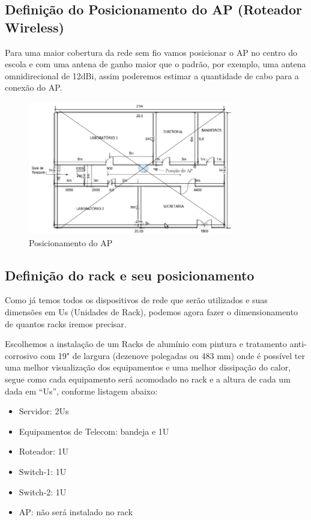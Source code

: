 \documentclass[	DIV=calc,%
							paper=a4,%
							fontsize=12pt,%
							onecolumn]{scrartcl}	 					%
\begin{document}
\subsection{Definição do Posicionamento do AP (Roteador Wireless)}
Para uma maior cobertura da rede sem fio vamos  posicionar o AP no centro do escola e com uma antena de ganho maior que o padrão, por exemplo, uma antena omnidirecional de 12dBi, assim poderemos estimar a quantidade de cabo para a conexão do AP.
\begin{figure}[H]
	\centering
	\includegraphics[width=0.8\textwidth]{fig4}
	\caption{Posicionamento do AP}
	\label{fig4}
\end{figure}

\subsection{Definição do rack e seu posicionamento}
 

Como já temos todos os dispositivos de rede que serão utilizados e suas dimensões em Us (Unidades de Rack), podemos agora fazer o dimensionamento de quantos racks iremos precisar. 

Escolhemos a instalação de um  Racks de alumínio com pintura e tratamento anti-corrosivo com 19" de largura (dezenove polegadas ou 483 mm) onde é possível ter uma melhor visualização dos equipamentos e uma melhor dissipação do calor, segue  como cada equipamento será acomodado no rack e a altura de cada um dada em “Us”, conforme listagem abaixo: 
\begin{itemize}
	\item Servidor: 2Us
	\item Equipamentos de Telecom: bandeja e 1U 
	\item Roteador: 1U 
	\item Switch-1: 1U 
	\item Switch-2: 1U 
	\item AP: não será instalado no rack
\end{itemize}
  
\end{document}
